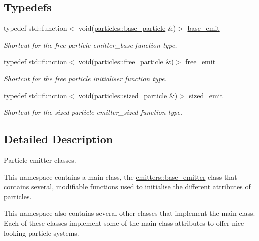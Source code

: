 \subsection*{Typedefs}
\begin{DoxyCompactItemize}
\item 
\mbox{\label{namespacephysim_1_1emitters_affb35fbd5f02c488436287899e35d4aa}} 
typedef std\+::function$<$ void(\hyperlink{classphysim_1_1particles_1_1base__particle}{particles\+::base\+\_\+particle} \&)$>$ \hyperlink{namespacephysim_1_1emitters_affb35fbd5f02c488436287899e35d4aa}{base\+\_\+emit}
\begin{DoxyCompactList}\small\item\em Shortcut for the free particle emitter\+\_\+base function type. \end{DoxyCompactList}\item 
\mbox{\label{namespacephysim_1_1emitters_a68725a630c2e0c1b4cdff4ca0ee174ac}} 
typedef std\+::function$<$ void(\hyperlink{classphysim_1_1particles_1_1free__particle}{particles\+::free\+\_\+particle} \&)$>$ \hyperlink{namespacephysim_1_1emitters_a68725a630c2e0c1b4cdff4ca0ee174ac}{free\+\_\+emit}
\begin{DoxyCompactList}\small\item\em Shortcut for the free particle initialiser function type. \end{DoxyCompactList}\item 
\mbox{\label{namespacephysim_1_1emitters_a924fdfab5324762db7bded5f2877ff87}} 
typedef std\+::function$<$ void(\hyperlink{classphysim_1_1particles_1_1sized__particle}{particles\+::sized\+\_\+particle} \&)$>$ \hyperlink{namespacephysim_1_1emitters_a924fdfab5324762db7bded5f2877ff87}{sized\+\_\+emit}
\begin{DoxyCompactList}\small\item\em Shortcut for the sized particle emitter\+\_\+sized function type. \end{DoxyCompactList}\end{DoxyCompactItemize}


\subsection{Detailed Description}
Particle emitter classes. 

This namespace contains a \textquotesingle{}main\textquotesingle{} class, the \hyperlink{classphysim_1_1emitters_1_1base__emitter}{emitters\+::base\+\_\+emitter} class that contains several, modifiable functions used to initialise the different attributes of particles.

This namespace also contains several other classes that implement the \textquotesingle{}main\textquotesingle{} class. Each of these classes implement some of the \textquotesingle{}main\textquotesingle{} class attributes to offer nice-\/looking particle systems. 